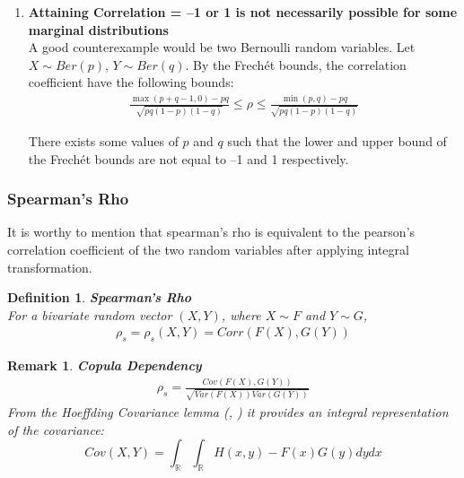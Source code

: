 \documentclass[12pt]{report}
\newtheorem{remark}{Remark}[section]
\newtheorem{definition}{Definition}[subsection]
\newcommand{\1}{\mathbf{1}}
\begin{document}
\begin{flushleft}
\begin{enumerate}
\item \textbf{Attaining Correlation = --1 or 1 is not necessarily possible for some marginal distributions} \\
\vspace{0.5cm}
A good counterexample would be two Bernoulli random variables. Let $X \sim Ber(p)$, $Y \sim Ber(q)$. By the Frech{\'e}t bounds, the correlation coefficient have the following bounds: \\
\vspace{-0.8cm}
\begin{align*}
\frac{\max(p+q-1,0) - pq}{\sqrt{pq(1-p)(1-q)}} \le \rho \le \frac{\min(p,q) - pq}{\sqrt{pq(1-p)(1-q)}}
\end{align*}

There exists some values of $p$ and $q$ such that the lower and upper bound of the Frech{\'e}t bounds are not equal to --1 and 1 respectively.\\ 
\end{enumerate}

\newpage
\subsubsection{Spearman's Rho}
\vspace{0.5cm}

It is worthy to mention that spearman's rho is equivalent to the pearson's correlation coefficient of the two random variables after applying integral transformation.

\begin{definition}\label{SpearmanRhoDefinition}
\textit{\normalfont\parencite{SpearmanRhoAuthor1904}}\:\textbf{Spearman's Rho}  \\
For a bivariate random vector $(X,Y)$, where $X \sim F$ and $Y \sim G$,
\begin{align*}
\rho_{s} = \rho_{s}(X,Y) = Corr(F(X),G(Y))
\end{align*}
\end{definition}

\begin{remark}\label{SpearmanRhoCopulaDependency}\: \textbf{Copula Dependency}\\

\begin{align*}
\rho_{s} = \frac{Cov(F(X),G(Y))}{\sqrt{Var(F(X))Var(G(Y))}}  
\end{align*}
From the Hoeffding Covariance lemma (\cite{höffding1940maßstabinvariante}, \cite{QRMMcNeil}) it provides an integral representation of the covariance: 
\begin{equation*}
Cov(X,Y) = \int_{\mathbb{R}} \int_{\mathbb{R}} H(x,y) - F(x)G(y) dydx 
\end{equation*}


\end{remark}
\end{flushleft}
\end{document}
